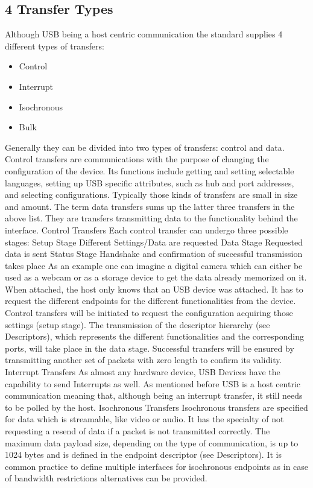 \subsection{ 4 Transfer Types}
Although USB being a host centric communication the standard supplies 4 different types of transfers: 
\begin{itemize}
 \item Control
 \item Interrupt
 \item Isochronous
 \item Bulk
\end{itemize}

Generally they can be divided into two types of transfers: control and data. Control transfers are communications with the purpose of changing the configuration of the device. Its functions include getting and setting selectable languages, setting up USB specific attributes, such as hub and port addresses, and selecting configurations. Typically those kinds of transfers are small in size and amount. 
The term data transfers sums up the latter three transfers in the above list. They are transfers transmitting data to the functionality behind the interface. 
Control Transfers
Each control transfer can undergo three possible stages: 
Setup Stage
Different Settings/Data are requested
Data Stage
Requested data is sent
Status Stage
Handshake and confirmation of successful transmission takes place
As an example one can imagine a digital camera which can either be used as a webcam or as a storage device to get the data already memorized on it. When attached, the host only knows that an USB device was attached. It has to request the different endpoints for the different functionalities from the device. Control transfers will be initiated to request the configuration acquiring those settings (setup stage). The transmission of the descriptor hierarchy (see Descriptors), which represents the different functionalities and the corresponding ports, will take place in the data stage. Successful transfers will be ensured by transmitting another set of packets with zero length to confirm its validity.
Interrupt Transfers
As almost any hardware device, USB Devices have the capability to send Interrupts as well. As mentioned before USB is a host centric communication meaning that, although being an interrupt transfer, it still needs to be polled by the host. 
Isochronous Transfers
Isochronous transfers are specified for data which is streamable, like video or audio. It has the specialty of not requesting a resend of data if a packet is not transmitted correctly. The maximum data payload size, depending on the type of communication, is up to 1024 bytes and is defined in the endpoint descriptor (see Descriptors). It is common practice to define multiple interfaces for isochronous endpoints as in case of bandwidth restrictions alternatives can be provided.
